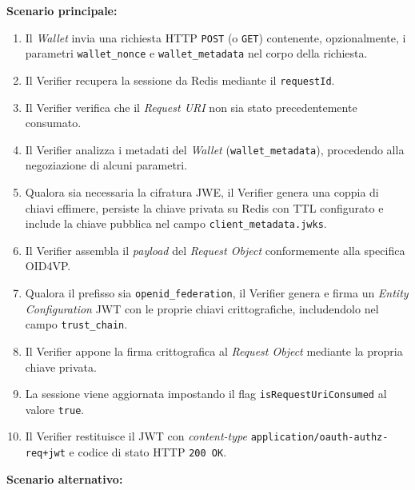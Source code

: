 \noindent\textbf{Scenario principale:}
\begin{enumerate}
    \item Il \textit{Wallet} invia una richiesta HTTP \texttt{POST} (o \texttt{GET}) contenente, opzionalmente, i parametri \texttt{wallet\_\allowbreak{}nonce} e \texttt{wallet\_\allowbreak{}metadata} nel corpo della richiesta.
    \item Il Verifier recupera la sessione da Redis mediante il \texttt{requestId}.
    \item Il Verifier verifica che il \textit{Request URI} non sia stato precedentemente consumato.
    \item Il Verifier analizza i metadati del \textit{Wallet} (\texttt{wallet\_\allowbreak{}metadata}), procedendo alla negoziazione di alcuni parametri.
    \item Qualora sia necessaria la cifratura JWE, il Verifier genera una coppia di chiavi effimere, persiste la chiave privata su Redis con TTL configurato e include la chiave pubblica nel campo \texttt{client\_\allowbreak{}metadata.jwks}.
    \item Il Verifier assembla il \textit{payload} del \textit{Request Object} conformemente alla specifica OID4VP.
    \item Qualora il prefisso sia \texttt{openid\_\allowbreak{}federation}, il Verifier genera e firma un \textit{Entity Configuration} JWT con le proprie chiavi crittografiche, includendolo nel campo \texttt{trust\_\allowbreak{}chain}.
    \item Il Verifier appone la firma crittografica al \textit{Request Object} mediante la propria chiave privata.
    \item La sessione viene aggiornata impostando il flag \texttt{isRequestUriConsumed} al valore \texttt{true}.
    \item Il Verifier restituisce il JWT con \textit{content-type} \texttt{application/oauth-\allowbreak{}authz-\allowbreak{}req+jwt} e codice di stato HTTP \texttt{200 OK}.
\end{enumerate}
\newpage
\noindent\textbf{Scenario alternativo:}
